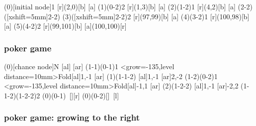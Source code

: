 \begin{tcblisting}{}
\begin{istgame}[scale=1.2]
\xtdistance{10mm}{20mm}
\istroot(0)[initial node]{1}
  [r]{(2,0)}[b]
  [a]
\endist
\istroot(1)(0-2){2}
  [r]{(1,3)}[b]
  [a]
\endist
\istroot(2)(1-2){1}
  [r]{(4,2)}[b]
  [a]
\endist
\xtInfoset(2-2)([xshift=5mm]2-2)
\istroot(3)([xshift=5mm]2-2){2}
  [r]{(97,99)}[b]
  [a]
\endist
\istroot(4)(3-2){1}
  [r]{(100,98)}[b]
  [a]
\endist
\istroot(5)(4-2){2}
  [r]{(99,101)}[b]
  [a]{(100,100)}[r]
\endist
\end{istgame}
\end{tcblisting}


\clearpage
\subsubsection{poker game}


\begin{tcblisting}{}
\begin{istgame}[scale=1.3]
\xtdistance{15mm}{30mm}
\istroot(0)[chance node]{N}
  [al]
  [ar]
\endist
\xtdistance{15mm}{30mm}
\istroot(1-1)(0-1){1}
  \istb<grow=-135,level distance=10mm>{Fold}[al]{1,-1}
  [ar]
\endist
\xtdistance{10mm}{20mm}
\istroot(1)(1-1-2)
  [al]{1,-1}
  [ar]{2,-2}
\endist
\xtdistance{15mm}{30mm}
\istroot(1-2)(0-2){1}
  \istb<grow=-135,level distance=10mm>{Fold}[al]{-1,1}
  [ar]
\endist
\xtdistance{10mm}{20mm}
\istroot(2)(1-2-2){}
  [al]{1,-1}
  [ar]{-2,2}
\endist
\xtInfoset(1-1-2)(1-2-2){2}
\xtActionLabel(0)(0-1){\ []}[r]
\xtActionLabel(0)(0-2){[]\ }[l]
\end{istgame}
\end{tcblisting}

\clearpage
\subsubsection{poker game: growing to the right}
\label{p:poker-right}

